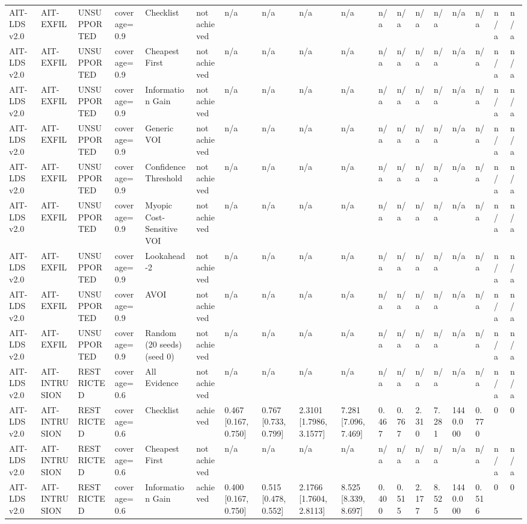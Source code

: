 \begin{table}[!ht]
{\begin{tabular}{llllllllllllllllll}
AIT-LDS v2.0 & AIT-EXFIL & UNSUPPORTED & coverage=0.9 & Checklist & not achieved & n/a & n/a & n/a & n/a & n/a & n/a & n/a & n/a & n/a & n/a & n/a & n/a \\
AIT-LDS v2.0 & AIT-EXFIL & UNSUPPORTED & coverage=0.9 & Cheapest First & not achieved & n/a & n/a & n/a & n/a & n/a & n/a & n/a & n/a & n/a & n/a & n/a & n/a \\
AIT-LDS v2.0 & AIT-EXFIL & UNSUPPORTED & coverage=0.9 & Information Gain & not achieved & n/a & n/a & n/a & n/a & n/a & n/a & n/a & n/a & n/a & n/a & n/a & n/a \\
AIT-LDS v2.0 & AIT-EXFIL & UNSUPPORTED & coverage=0.9 & Generic VOI & not achieved & n/a & n/a & n/a & n/a & n/a & n/a & n/a & n/a & n/a & n/a & n/a & n/a \\
AIT-LDS v2.0 & AIT-EXFIL & UNSUPPORTED & coverage=0.9 & Confidence Threshold & not achieved & n/a & n/a & n/a & n/a & n/a & n/a & n/a & n/a & n/a & n/a & n/a & n/a \\
AIT-LDS v2.0 & AIT-EXFIL & UNSUPPORTED & coverage=0.9 & Myopic Cost-Sensitive VOI & not achieved & n/a & n/a & n/a & n/a & n/a & n/a & n/a & n/a & n/a & n/a & n/a & n/a \\
AIT-LDS v2.0 & AIT-EXFIL & UNSUPPORTED & coverage=0.9 & Lookahead-2 & not achieved & n/a & n/a & n/a & n/a & n/a & n/a & n/a & n/a & n/a & n/a & n/a & n/a \\
AIT-LDS v2.0 & AIT-EXFIL & UNSUPPORTED & coverage=0.9 & AVOI & not achieved & n/a & n/a & n/a & n/a & n/a & n/a & n/a & n/a & n/a & n/a & n/a & n/a \\
AIT-LDS v2.0 & AIT-EXFIL & UNSUPPORTED & coverage=0.9 & Random (20 seeds) (seed 0) & not achieved & n/a & n/a & n/a & n/a & n/a & n/a & n/a & n/a & n/a & n/a & n/a & n/a \\
AIT-LDS v2.0 & AIT-INTRUSION & RESTRICTED & coverage=0.6 & All Evidence & not achieved & n/a & n/a & n/a & n/a & n/a & n/a & n/a & n/a & n/a & n/a & n/a & n/a \\
AIT-LDS v2.0 & AIT-INTRUSION & RESTRICTED & coverage=0.6 & Checklist & achieved & 0.467 [0.167, 0.750] & 0.767 [0.733, 0.799] & 2.3101 [1.7986, 3.1577] & 7.281 [7.096, 7.469] & 0.467 & 0.767 & 2.310 & 7.281 & 1440.000 & 0.770 & 0 & 0 \\
AIT-LDS v2.0 & AIT-INTRUSION & RESTRICTED & coverage=0.6 & Cheapest First & not achieved & n/a & n/a & n/a & n/a & n/a & n/a & n/a & n/a & n/a & n/a & n/a & n/a \\
AIT-LDS v2.0 & AIT-INTRUSION & RESTRICTED & coverage=0.6 & Information Gain & achieved & 0.400 [0.167, 0.750] & 0.515 [0.478, 0.552] & 2.1766 [1.7604, 2.8113] & 8.525 [8.339, 8.697] & 0.400 & 0.515 & 2.177 & 8.525 & 1440.000 & 0.516 & 0 & 0 \\

\end{tabular}}
\end{table}
